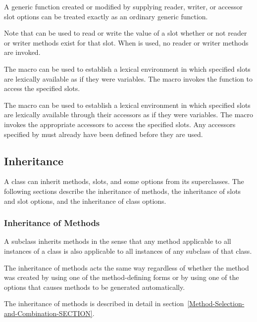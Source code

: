 A generic function created or modified by supplying reader, writer, or
accessor slot options can be treated exactly as an ordinary generic
function.

Note that  can be used to read or write the value of a
slot whether or not reader or writer methods exist for that slot.
When  is used, no reader or writer methods are
invoked.

The macro  can be used to establish a lexical
environment in which specified slots are lexically available as if they
were variables.  The macro  invokes the function 
 to access the specified slots.

The macro  can be used to establish a lexical
environment in which specified slots are lexically available through
their accessors as if they were variables.  The macro 
 invokes the appropriate accessors to access the
specified slots. Any accessors specified by  must
already have been defined before they are used.


\subsection{Inheritance}
\label{Inheritance-SECTION}

A class can inherit methods, slots, and some  options
from its superclasses.  The following sections describe the inheritance of
methods, the inheritance of slots and slot options, and the inheritance of
class options.
 
\subsubsection{Inheritance of Methods}
\label{Inheritance-of-Methods-SECTION}

A subclass inherits methods in the sense that any method applicable to
all instances of a class is also applicable to all instances of any
subclass of that class.

The inheritance of methods acts the same way regardless of whether the
method was created by using one of the method-defining forms or by
using one of the  options that causes methods to be
generated automatically.

The inheritance of methods is described in detail in
section~\ref{Method-Selection-and-Combination-SECTION}.


